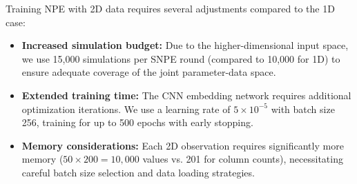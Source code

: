 \documentclass{article}
\begin{document}
Training NPE with 2D data requires several adjustments compared to the 1D case:

\begin{itemize}
	\item \textbf{Increased simulation budget:} Due to the higher-dimensional input space, we use 15,000 simulations per SNPE round (compared to 10,000 for 1D) to ensure adequate coverage of the joint parameter-data space.
	
	\item \textbf{Extended training time:} The CNN embedding network requires additional optimization iterations. We use a learning rate of $5 \times 10^{-5}$ with batch size 256, training for up to 500 epochs with early stopping.
	
	\item \textbf{Memory considerations:} Each 2D observation requires significantly more memory ($50 \times 200 = 10,000$ values vs. 201 for column counts), necessitating careful batch size selection and data loading strategies.
\end{itemize}





  
\end{document}
